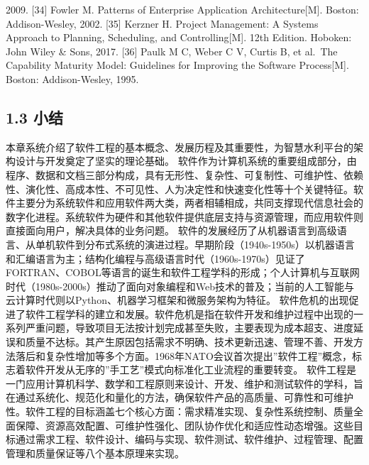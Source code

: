 2009. {[}34{]} Fowler M. Patterns of Enterprise Application Architecture{[}M{]}. Boston: Addison-Wesley, 2002. {[}35{]} Kerzner H. Project Management: A Systems Approach to Planning, Scheduling, and Controlling{[}M{]}. 12th Edition. Hoboken: John Wiley \& Sons, 2017. {[}36{]} Paulk M C, Weber C V, Curtis B, et al.~The Capability Maturity Model: Guidelines for Improving the Software Process{[}M{]}. Boston: Addison-Wesley, 1995.

\subsection{1.3 小结}\label{ux5c0fux7ed3} 本章系统介绍了软件工程的基本概念、发展历程及其重要性，为智慧水利平台的架构设计与开发奠定了坚实的理论基础。 软件作为计算机系统的重要组成部分，由程序、数据和文档三部分构成，具有无形性、复杂性、可复制性、可维护性、依赖性、演化性、高成本性、不可见性、人为决定性和快速变化性等十个关键特征。软件主要分为系统软件和应用软件两大类，两者相辅相成，共同支撑现代信息社会的数字化进程。系统软件为硬件和其他软件提供底层支持与资源管理，而应用软件则直接面向用户，解决具体的业务问题。 软件的发展经历了从机器语言到高级语言、从单机软件到分布式系统的演进过程。早期阶段（1940s-1950s）以机器语言和汇编语言为主；结构化编程与高级语言时代（1960s-1970s）见证了FORTRAN、COBOL等语言的诞生和软件工程学科的形成；个人计算机与互联网时代（1980s-2000s）推动了面向对象编程和Web技术的普及；当前的人工智能与云计算时代则以Python、机器学习框架和微服务架构为特征。 软件危机的出现促进了软件工程学科的建立和发展。软件危机是指在软件开发和维护过程中出现的一系列严重问题，导致项目无法按计划完成甚至失败，主要表现为成本超支、进度延误和质量不达标。其产生原因包括需求不明确、技术更新迅速、管理不善、开发方法落后和复杂性增加等多个方面。1968年NATO会议首次提出''软件工程''概念，标志着软件开发从无序的''手工艺''模式向标准化工业流程的重要转变。 软件工程是一门应用计算机科学、数学和工程原则来设计、开发、维护和测试软件的学科，旨在通过系统化、规范化和量化的方法，确保软件产品的高质量、可靠性和可维护性。软件工程的目标涵盖七个核心方面：需求精准实现、复杂性系统控制、质量全面保障、资源高效配置、可维护性强化、团队协作优化和适应性动态增强。这些目标通过需求工程、软件设计、编码与实现、软件测试、软件维护、过程管理、配置管理和质量保证等八个基本原理来实现。 